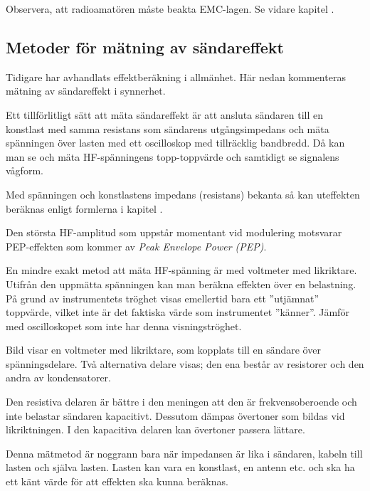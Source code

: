 Observera, att radioamatören måste beakta EMC-lagen.
Se vidare kapitel .

\subsection{Metoder för mätning av sändareffekt}

Tidigare har avhandlats effektberäkning i allmänhet.
Här nedan kommenteras mätning av sändareffekt i synnerhet.

Ett tillförlitligt sätt att mäta sändareffekt är att ansluta sändaren
till en konstlast med samma resistans som sändarens utgångsimpedans
och mäta spänningen över lasten med ett oscilloskop med tillräcklig bandbredd.
Då kan man se och mäta HF-spänningens topp-toppvärde och samtidigt se
signalens vågform.

Med spänningen och konstlastens impedans (resistans) bekanta så kan
uteffekten beräknas enligt formlerna i kapitel .

Den största HF-amplitud som uppstår momentant vid modulering motsvarar
PEP-effekten som kommer av \emph{Peak Envelope Power (PEP)}.

En mindre exakt metod att mäta HF-spänning är med voltmeter med likriktare.
Utifrån den uppmätta spänningen kan man beräkna effekten över en belastning.
På grund av instrumentets tröghet visas emellertid bara ett ''utjämnat''
toppvärde, vilket inte är det faktiska värde som instrumentet ''känner''.
Jämför med oscilloskopet som inte har denna visningströghet.


Bild  visar en voltmeter med likriktare, som kopplats till
en sändare över spänningsdelare.
Två alternativa delare visas; den ena består av resistorer och den andra av
kondensatorer.

Den resistiva delaren är bättre i den meningen att den är frekvensoberoende och
inte belastar sändaren kapacitivt.
Dessutom dämpas övertoner som bildas vid likriktningen.
I den kapacitiva delaren kan övertoner passera lättare.

Denna mätmetod är noggrann bara när impedansen är lika i sändaren,
kabeln till lasten och själva lasten.
Lasten kan vara en konstlast, en antenn etc. och ska ha ett känt värde för att
effekten ska kunna beräknas.

